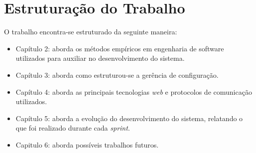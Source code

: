 \section{Estruturação do Trabalho}
O trabalho encontra-se estruturado da seguinte maneira:

\begin{itemize}
    \item Capítulo 2: aborda os métodos empíricos em engenharia de software utilizados para
    auxiliar no desenvolvimento do sistema.
    \item Capítulo 3: aborda como estruturou-se a gerência de configuração.
    \item Capítulo 4: aborda as principais tecnologias \textit{web} e protocolos de comunicação utilizados.
    \item Capítulo 5: aborda a evolução do desenvolvimento do sistema, relatando o que foi realizado durante cada \textit{sprint}.
    \item Capitulo 6: aborda possíveis trabalhos futuros.
\end{itemize}